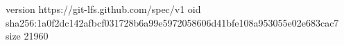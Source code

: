 version https://git-lfs.github.com/spec/v1
oid sha256:1a0f2dc142afbcf031728b6a99e5972058606d41bfe108a953055e02e683cac7
size 21960
